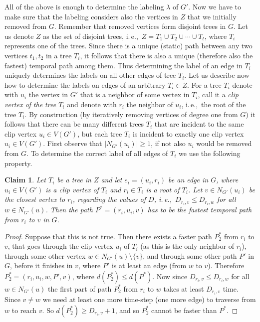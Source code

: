 \documentclass[11pt,a4paper]{article}
\newtheorem{claim}[theorem]{Claim}
\theoremstyle{remark}
\theoremstyle{definition}
\newcommand{\ie}{i.\,e.,\ }
\begin{document}
All of the above is enough to determine the labeling $\lambda$ of $G'$. Now we have to make sure that the labeling considers also the vertices in $Z$ that we initially removed from $G$.
Remember that removed vertices form disjoint trees in $G$.
Let us denote $Z$ as the set of disjoint trees, \ie $Z = T_1 \cup T_2 \cup \cdots \cup T_t$, where $T_i$ represents one of the trees.
Since there is a unique (static) path between any two vertices $t_1, t_2$ in a tree $T_i$,
it follows that there is also a unique (therefore also the fastest) temporal path among them.
Thus determining the label of an edge in $T_i$ uniquely determines the labels on all other edges of tree $T_i$.
Let us describe now how to determine the labels on edges of an arbitrary $T_i \in Z$.
For a tree $T_i$ denote with $u_i$ the vertex in $G'$ that is a neighbor of some vertex in $T_i$, 
call it a \emph{clip vertex of the tree $T_i$}
and denote with $r_i$ the neighbor of $u_i$, \ie the root of the tree $T_i$.
By construction (by iteratively removing vertices of degree one from $G$) it follows that there can be many different trees $T_i$ that are incident to the same clip vertex $u_i \in V(G')$,
but each tree $T_i$ is incident to exactly one clip vertex $u_i \in V(G')$.
First observe that $|N_{G'}(u_i)|\geq 1$, if not also $u_i$ would be removed from $G$.
To determine the correct label of all edges of $T_i$ we use the following property.
\begin{claim}
Let $T_i$ be a tree in $Z$ and let $e_i = (u_i,r_i)$ be an edge in $G$, where $u_i \in V(G')$ is a clip vertex of $T_i$ and $r_i \in T_i$ is a root of $T_i$.
Let $v \in N_{G'}(u_i)$ be the closest vertex to $r_i$, regarding the values of $D$, \ie  $D_{r_i,v} \leq D_{r_i,w}$ for all $w \in N_{G'}(u)$.
Then the path $P^*=(r_i,u_i,v)$ has to be the fastest temporal path from $r_i$ to $v$ in $G$.
\end{claim}
\begin{proof}
Suppose that this is not true.
Then there exists a faster path $P^*_2$ from $r_i$ to $v$, that goes through the clip vertex $u_i$ of $T_i$ (as this is the only neighbor of $r_i$), through some other vertex $w \in N_{G'}(u) \setminus \{v \}$, 
and through some other path $P'$ in $G$, before it finishes in $v$, where $P'$ is at least an edge (from $w$ to $v$). 
Therefore $P^*_2= (r_i,u_i,w,P',v)$, where $d(P^*_2) \leq d(P^*)$.
Now since $D_{r_i,v} \leq D_{r_i,w}$ for all $ w\in N_{G'}(u)$ the first part of path $P^*_2$ from $r_i$ to $w$ takes at least $D_{r_i,v}$ time.
Since $v \neq w$ we need at least one more time-step (one more edge) to traverse from $w$ to reach $v$. 
So $d(P^*_2) \geq D_{r_i,v} + 1$, and so $P^*_2$ cannot be faster than $P^*$.
\end{proof}
\end{document}
